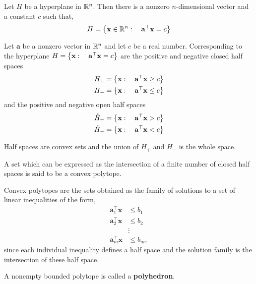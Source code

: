 \begin{proposition}
	Let $H$ be a hyperplane in $\mathbb{R}^n$. Then there is a nonzero $n$-dimensional vector and a constant $c$ such that,
	\begin{equation*}
		H=\left\lbrace \mathbf{x}\in\mathbb{R}^n:\quad \mathbf{a}^\top \mathbf{x}=c \right\rbrace
	\end{equation*}
\end{proposition}

\begin{definition}
	Let $\mathbf{a}$ be a nonzero vector in $\mathbb{R}^n$ and let $c$ be a real number. Corresponding to the hyperplane $H=\left\lbrace \mathbf{x}:\quad \mathbf{a}^\top \mathbf{x}=c \right\rbrace$ are the positive and negative closed half spaces 
	\begin{align*}
		H_+ = \left\lbrace \mathbf{x}:\quad \mathbf{a}^\top \mathbf{x}\geq c \right\rbrace\\
		H_- = \left\lbrace \mathbf{x}:\quad \mathbf{a}^\top \mathbf{x}\leq c \right\rbrace
	\end{align*}
	and the positive and negative open half spaces
	\begin{align*}
	\mathring{H}_+ = \left\lbrace \mathbf{x}:\quad \mathbf{a}^\top \mathbf{x}> c \right\rbrace\\
	\mathring{H}_- = \left\lbrace \mathbf{x}:\quad \mathbf{a}^\top \mathbf{x}< c \right\rbrace
	\end{align*}
\end{definition}

Half spaces are convex sets and the union of $H_+$ and $H_-$ is the whole space.


\begin{definition}
	A set which can be expressed as the intersection of a finite number of closed half spaces is said to be a convex polytope.
\end{definition}

Convex polytopes are the sets obtained as the family of solutions to a set of linear inequalities of the form,
\begin{align*}
	\mathbf{a}_1^\top \mathbf{x}&\leq b_1 \\
	\mathbf{a}_2^\top \mathbf{x}&\leq b_2 \\
	&\vdots \\
	\mathbf{a}_m^\top \mathbf{x}&\leq b_m,
\end{align*}
since each individual inequality defines a half space and the solution family is the intersection of these half space. 

\begin{definition}
A nonempty bounded polytope is called a \textbf{polyhedron}.
\end{definition}

